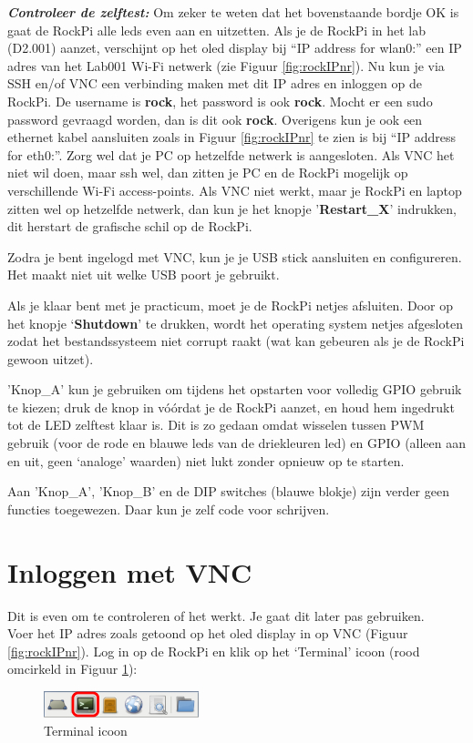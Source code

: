 \textbf{\textit{Controleer de zelftest:}} Om zeker te weten dat het bovenstaande bordje OK is gaat de RockPi alle leds even aan en uitzetten. \newline
Als je de RockPi in het lab (D2.001) aanzet, verschijnt op het oled display bij “IP address for wlan0:” een IP adres van het Lab001 Wi-Fi netwerk (zie Figuur \ref{fig:rockIPnr}). \newline
Nu kun je via SSH en/of VNC een verbinding maken met dit IP adres en inloggen op de RockPi.
De username is \textbf{rock}, het password is ook \textbf{rock}. Mocht er een sudo password gevraagd worden, dan is dit ook \textbf{rock}.
Overigens kun je ook een ethernet kabel aansluiten zoals in Figuur \ref{fig:rockIPnr} te zien is bij “IP address for eth0:”.\break\newline
Zorg wel dat je PC op hetzelfde netwerk is aangesloten. Als VNC het niet wil doen, maar ssh wel, dan zitten je PC en de RockPi mogelijk op verschillende Wi-Fi access-points. Als VNC niet werkt, maar je RockPi en laptop zitten wel op hetzelfde netwerk, dan kun je het knopje '\textbf{Restart\_X}' indrukken, dit herstart de grafische schil op de RockPi.

Zodra je bent ingelogd met VNC, kun je je USB stick aansluiten en configureren. Het maakt niet uit welke USB poort je gebruikt. 

Als je klaar bent met je practicum, moet je de RockPi netjes afsluiten. Door op het knopje ‘\textbf{Shutdown}’ te drukken, wordt het operating system netjes afgesloten zodat het bestandssysteem niet corrupt raakt (wat kan gebeuren als je de RockPi gewoon uitzet).

'Knop\_A' kun je gebruiken om tijdens het opstarten voor volledig GPIO gebruik te kiezen; druk de knop in vóórdat je de RockPi aanzet, en houd hem ingedrukt tot de LED zelftest klaar is. Dit is zo gedaan omdat wisselen tussen PWM gebruik (voor de rode en blauwe leds van de driekleuren led) en GPIO (alleen aan en uit, geen ‘analoge’ waarden) niet lukt zonder opnieuw op te starten.

Aan 'Knop\_A', 'Knop\_B' en de DIP switches (blauwe blokje) zijn verder geen functies toegewezen. Daar kun je zelf code voor schrijven.

\section{Inloggen met VNC}
Dit is even om te controleren of het werkt. Je gaat dit later pas gebruiken. \\Voer het IP adres zoals getoond op het oled display in op VNC (Figuur \ref{fig:rockIPnr}).\newline
Log in op de RockPi en klik op het ‘Terminal’ icoon (rood omcirkeld in Figuur \ref{fig:termico}):
\begin{figure}[h!]
	\centering
	\begin{center} 	
		\includegraphics[width=0.4\textwidth]{figuren/Terminal-icoon}
		\caption{Terminal icoon}
		\label{fig:termico}   
	\end{center}
\end{figure}

